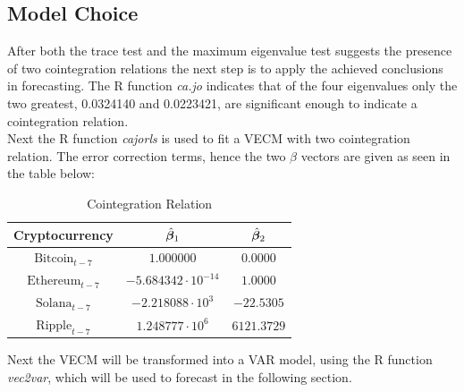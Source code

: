 \subsection{Model Choice}
After both the trace test and the maximum eigenvalue test suggests the presence of two cointegration relations the next step is to apply the achieved conclusions in forecasting. The R function \textit{ca.jo} indicates that of the four eigenvalues only the two greatest, 0.0324140 and 0.0223421, are significant enough to indicate a cointegration relation.\\
Next the R function \textit{cajorls} is used to fit a VECM with two cointegration relation. The error correction terms, hence the two $\beta$ vectors are given as seen in the table below:\\
\begin{table}[h!]
\centering
\begin{tabular}{|c|c|c|}
\hline
\textbf{Cryptocurrency} & $\hat{\boldsymbol{\beta}}_1$ & $\hat{\boldsymbol{\beta}}_2$ \\ \hline
 $\text{Bitcoin}_{t-7}$  & $1.000000$  & $0.0000$      \\ \hline
 $\text{Ethereum}_{t-7}$  & $-5.684342 \cdot 10^{-14}$ & $1.0000$    \\\hline
 $\text{Solana}_{t-7}$  & $-2.218088 \cdot 10^3$ & $-22.5305$    \\ \hline
 $\text{Ripple}_{t-7}$  & $1.248777 \cdot 10^6$  & $6121.3729$   \\ \hline
\end{tabular}
\caption{Cointegration Relation}
\label{tab:ect_coefficients}
\end{table}

\noindent Next the VECM will be transformed into a VAR model, using the R function \textit{vec2var}, which will be used to forecast in the following section.



